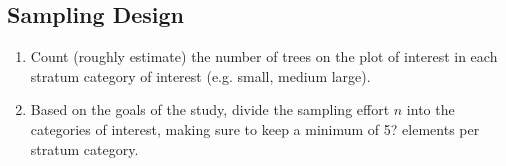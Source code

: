 \documentclass{beamer}
\def\bm#1{\mbox{\boldmath $#1$}}
\begin{document}
% 
%
\begin{frame}
  \section{Sampling Design}
  \begin{enumerate}
    \item Count (roughly estimate) the number of trees on the plot of interest in each stratum category of interest (e.g. small, medium large). \vspace{3mm}
    \item Based on the goals of the study, divide the sampling effort $n$ into the categories of interest, making sure to keep a minimum of 5? elements per stratum category.
  \end{enumerate}
\end{frame}
\end{document}
